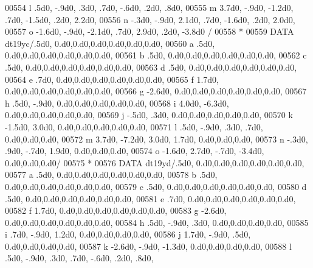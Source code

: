 \begin{DoxyCode}
00554      l            .5d0,  -.9d0,   .3d0,   .7d0,  -.6d0,   .2d0,   .8d0,
00555      m           3.7d0,  -.9d0, -1.2d0,   .7d0, -1.5d0,   .2d0,  2.2d0,
00556      n           -.3d0,  -.9d0,  2.1d0,   .7d0, -1.6d0,   .2d0,  2.0d0,
00557      o          -1.6d0,  -.9d0, -2.1d0,   .7d0,  2.9d0,   .2d0, -3.8d0 /
00558 \textcolor{comment}{*}
00559       \textcolor{keyword}{DATA} dt19yc/.5d0,                  0.d0,0.d0,0.d0,0.d0,0.d0,0.d0,
00560      a            .5d0,                  0.d0,0.d0,0.d0,0.d0,0.d0,0.d0,
00561      b            .5d0,                  0.d0,0.d0,0.d0,0.d0,0.d0,0.d0,
00562      c            .5d0,                  0.d0,0.d0,0.d0,0.d0,0.d0,0.d0,
00563      d            .5d0,                  0.d0,0.d0,0.d0,0.d0,0.d0,0.d0,
00564      e            .7d0,                  0.d0,0.d0,0.d0,0.d0,0.d0,0.d0,
00565      f           1.7d0,                  0.d0,0.d0,0.d0,0.d0,0.d0,0.d0,
00566      g          -2.6d0,                  0.d0,0.d0,0.d0,0.d0,0.d0,0.d0,
00567      h            .5d0,  -.9d0,             0.d0,0.d0,0.d0,0.d0,0.d0,
00568      i           4.0d0, -6.3d0,             0.d0,0.d0,0.d0,0.d0,0.d0,
00569      j           -.5d0,   .3d0,             0.d0,0.d0,0.d0,0.d0,0.d0,
00570      k          -1.5d0,  3.0d0,             0.d0,0.d0,0.d0,0.d0,0.d0,
00571      l            .5d0,  -.9d0,   .3d0,   .7d0,          0.d0,0.d0,0.d0,
00572      m           3.7d0, -7.2d0,  3.0d0,  1.7d0,          0.d0,0.d0,0.d0,
00573      n           -.3d0,   .9d0,  -.7d0,  1.9d0,          0.d0,0.d0,0.d0,
00574      o          -1.6d0,  2.7d0,  -.7d0, -3.4d0,          0.d0,0.d0,0.d0/
00575 \textcolor{comment}{*}
00576       \textcolor{keyword}{DATA} dt19yd/.5d0,                  0.d0,0.d0,0.d0,0.d0,0.d0,0.d0,
00577      a            .5d0,                  0.d0,0.d0,0.d0,0.d0,0.d0,0.d0,
00578      b            .5d0,                  0.d0,0.d0,0.d0,0.d0,0.d0,0.d0,
00579      c            .5d0,                  0.d0,0.d0,0.d0,0.d0,0.d0,0.d0,
00580      d            .5d0,                  0.d0,0.d0,0.d0,0.d0,0.d0,0.d0,
00581      e            .7d0,                  0.d0,0.d0,0.d0,0.d0,0.d0,0.d0,
00582      f           1.7d0,                  0.d0,0.d0,0.d0,0.d0,0.d0,0.d0,
00583      g          -2.6d0,                  0.d0,0.d0,0.d0,0.d0,0.d0,0.d0,
00584      h            .5d0,  -.9d0,   .3d0,             0.d0,0.d0,0.d0,0.d0,
00585      i            .7d0,  -.9d0,  1.2d0,             0.d0,0.d0,0.d0,0.d0,
00586      j           1.7d0,  -.9d0,   .5d0,             0.d0,0.d0,0.d0,0.d0,
00587      k          -2.6d0,  -.9d0, -1.3d0,             0.d0,0.d0,0.d0,0.d0,
00588      l            .5d0,  -.9d0,   .3d0,   .7d0,  -.6d0,   .2d0,   .8d0,

\end{DoxyCode}
